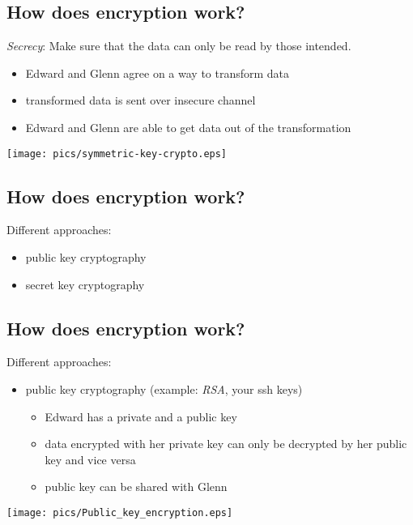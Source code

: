 \documentclass[xga]{xdvislides}
\begin{document}
\subsection{How does encryption work?}
{\em Secrecy}:  Make sure that the data can only be read by those intended.
\begin{itemize}
	\item {}Edward and Glenn agree on a way to transform data
	\item transformed data is sent over insecure channel
	\item Edward and Glenn are able to get data out of the transformation
\end{itemize}
\addvspace{.5in}
\begin{center}
	\texttt{[image: pics/symmetric-key-crypto.eps]}
\end{center}

\subsection{How does encryption work?}
Different approaches:
\begin{itemize}
	\item public key cryptography
	\item secret key cryptography
\end{itemize}

\subsection{How does encryption work?}
Different approaches:
\begin{itemize}
	\item public key cryptography (example: {\em RSA}, your ssh keys)
		\begin{itemize}
			\item Edward has a private and a public key
			\item data encrypted with her private key can only be decrypted by
				her public key and vice versa
			\item public key can be shared with Glenn
		\end{itemize}
\end{itemize}

\begin{center}
	\texttt{[image: pics/Public\_key\_encryption.eps]}
 \end{center}
\end{document}
